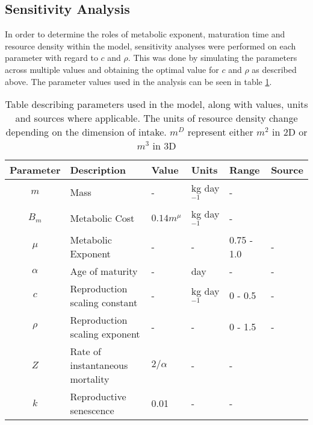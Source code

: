 \documentclass[a4paper, 11pt, hidelinks]{article} %
\begin{document}
	
	\subsection{Sensitivity Analysis}

	In order to determine the roles of metabolic exponent, maturation time and resource density within the model, sensitivity analyses were performed on each parameter with regard to $c$ and $\rho$.  This was done by simulating the parameters across multiple values and obtaining the optimal value for $c$ and $\rho$ as described above.
	The parameter values used in the analysis can be seen in table \ref{parameters}.
	
	\begin{centering}
		
		
		\begin{table}[h!]
			
			\caption{Table describing parameters used in the model, along with values, units and sources where applicable.  The units of resource density change depending on the dimension of intake.  $m^D$ represent either $m^2$ in 2D or $m^3$ in 3D} 
			\label{parameters}
			\vspace{2mm}
			{\RaggedRight %
			\begin{tabular}{c p{3.9cm} l l l p{3cm}}
				\hline
				Parameter 	& Description 			& Value 	& Units 	& Range 		& Source \\
				\hline
				$m$			& Mass					& -			& kg day$^{-1}$& -			&		\\
				
				$B_m$		& Metabolic Cost		& $0.14 m^{\mu}$ & kg day$^{-1}$& - 	& \cite{Peters1983}\\
				$\mu$		& Metabolic Exponent	& -			&	-		& 0.75 - 1.0	& - \\
				$\alpha$	& Age of maturity		& -     	& day		& -				& -\\
				$c$			& Reproduction scaling constant & - & kg day$^{-1}$& 0 - 0.5 		& -\\
				$\rho$		& Reproduction scaling exponent	& -	&	-		& 0 - 1.5			& -\\
				$Z$			& Rate of instantaneous mortality& $2/\alpha$	& -&-& \cite{Charnov2001}\\%
				$k$			& Reproductive senescence & 0.01	& -			& -				\\
				

\end{tabular}}
\end{table}
\end{centering}
\end{document}
